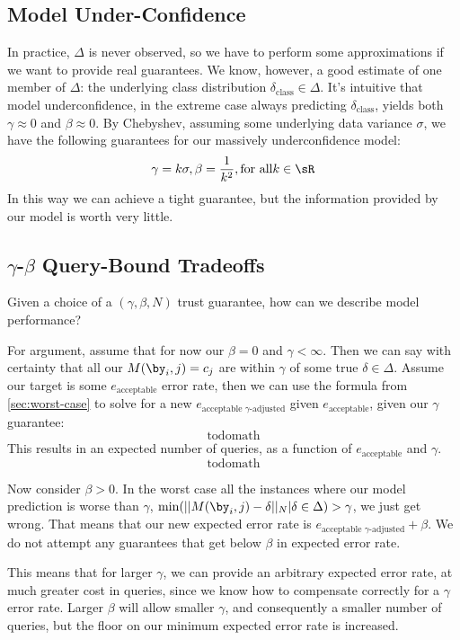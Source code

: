 \subsection{Model Under-Confidence}

In practice, $\Delta$ is never observed, so we have to perform some approximations if we want to provide real guarantees.
We know, however, a good estimate of one member of $\Delta$: the underlying class distribution $\delta_{\text{class}} \in \Delta$.
It's intuitive that model underconfidence, in the extreme case always predicting $\delta_{\text{class}}$, yields both $\gamma \approx 0$ and $\beta \approx 0$.
By Chebyshev, assuming some underlying data variance $\sigma$, we have the following guarantees for our massively underconfidence model:
\[\gamma = k\sigma, \beta = \frac{1}{k^2}, \text{for all} k \in \sR\]
In this way we can achieve a tight guarantee, but the information provided by our model is worth very little.

\subsection{$\gamma$-$\beta$ Query-Bound Tradeoffs}

Given a choice of a $(\gamma, \beta, N)$ trust guarantee, how can we describe model performance?

For argument, assume that for now our $\beta = 0$ and $\gamma < \infty$.
Then we can say with certainty that all our $M(\by_i, j) = c_j$ are within $\gamma$ of some true $\delta \in \Delta$.
Assume our target is some $e_{\text{acceptable}}$ error rate, then we can use the formula from \ref{sec:worst-case} to solve for a new $e_{\text{acceptable $\gamma$-adjusted}}$ given $e_{\text{acceptable}}$, given our $\gamma$ guarantee:
\[\text{todo{math}}\]
This results in an expected number of queries, as a function of $e_{\text{acceptable}}$ and $\gamma$.
\[\text{todo{math}}\]

Now consider $\beta > 0$. In the worst case all the instances where our model prediction is worse than $\gamma$, $\min (||M(\by_i, j) - \delta||_N | \delta \in \Delta) > \gamma$, we just get wrong.
That means that our new expected error rate is $e_{\text{acceptable $\gamma$-adjusted}} + \beta$.
We do not attempt any guarantees that get below $\beta$ in expected error rate.

This means that for larger $\gamma$, we can provide an arbitrary expected error rate, at much greater cost in queries, since we know how to compensate correctly for a $\gamma$ error rate.
Larger $\beta$ will allow smaller $\gamma$, and consequently a smaller number of queries, but the floor on our minimum expected error rate is increased.

